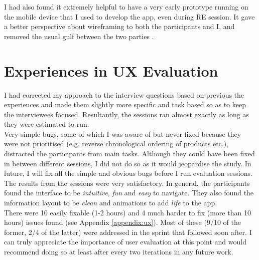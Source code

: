 I had also found it extremely helpful to have a very early prototype running on the mobile device \cite{Kangas:2005} that I used to develop the app, even during RE session. It gave a better perspective about wireframing to both the participants and I, and removed the usual gulf between the two parties \cite{Vermeeren:2010}.

\section{Experiences in UX Evaluation}

I had corrected my approach to the interview questions based on previous the experiences and made them slightly more specific and task based so as to keep the interviewees focused. Resultantly, the sessions ran almost exactly as long as they were estimated to run.\\

Very simple bugs, some of which I was aware of but never fixed because they were not prioritised (e.g. reverse chronological ordering of products etc.), distracted the participants from main tasks. Although they could have been fixed in between different sessions, I did not do so as it would jeopardise the study. In future, I will fix all the simple and obvious bugs before I run evaluation sessions.\\

The results from the sessions were very satisfactory. In general, the participants found the interface to be \textit{intuitive}, \textit{fun} and \textit{easy} to navigate. They also found the information layout to be \textit{clean} and animations to add \textit{life} to the app.\\

There were 10 easily fixable (1-2 hours) and 4 much harder to fix (more than 10 hours) issues found (see Appendix \ref{appendix:ux}). Most of these (9/10 of the former, 2/4 of the latter) were addressed in the sprint that followed soon after. I can truly appreciate the importance of user evaluation at this point and would recommend doing so at least after every two iterations in any future work.